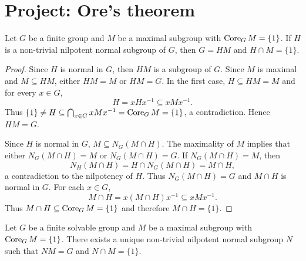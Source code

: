 \section{Project: Ore's theorem}



\begin{lemma}
    \label{lem:Ore_step1}
    Let $G$ be a finite group and $M$ be a maximal subgroup with 
    $\operatorname{Core}_GM=\{1\}$. If $H$ is a non-trivial nilpotent 
    normal subgroup of $G$, then $G=HM$ and $H\cap M=\{1\}$. 
\end{lemma}

\begin{proof}
    Since $H$ is normal in $G$, then $HM$ is a subgroup of $G$. Since $M$ 
    is maximal and $M\subseteq HM$, either $HM=M$ or $HM=G$. In the first case, 
    $H\subseteq HM=M$ and for every $x\in G$, 
    \[
    H=xHx^{-1}\subseteq xMx^{-1}.
    \]
    Thus $\{1\}\ne H\subseteq\bigcap_{x\in G}xMx^{-1}=\operatorname{Core}_GM=\{1\}$, a contradiction. 
    Hence $HM=G$. 

    Since $H$ is normal in $G$, $M\subseteq N_G(M\cap H)$. The maximality of $M$ implies that  
    either $N_G(M\cap H)=M$ or $N_G(M\cap H)=G$. If $N_G(M\cap H)=M$, then 
    \[
    N_H(M\cap H)=H\cap N_G(M\cap H)=M\cap H,
    \]
    a contradiction to the nilpotency of $H$. Thus $N_G(M\cap H)=G$ and 
    $M\cap H$ is normal in $G$. For each $x\in G$, 
    \[
    M\cap H=x(M\cap H)x^{-1}\subseteq xMx^{-1}.
    \]
    Thus $M\cap H\subseteq\operatorname{Core}_GM=\{1\}$ and therefore $M\cap H=\{1\}$. 
\end{proof}

\begin{lemma}
\label{lem:Ore_step2}
    Let $G$ be a finite solvable group and $M$ be a maximal subgroup with 
    $\operatorname{Core}_GM=\{1\}$. There exists a unique 
    non-trivial nilpotent normal subgroup $N$ such that 
    $NM=G$ and $N\cap M=\{1\}$.   
\end{lemma}


